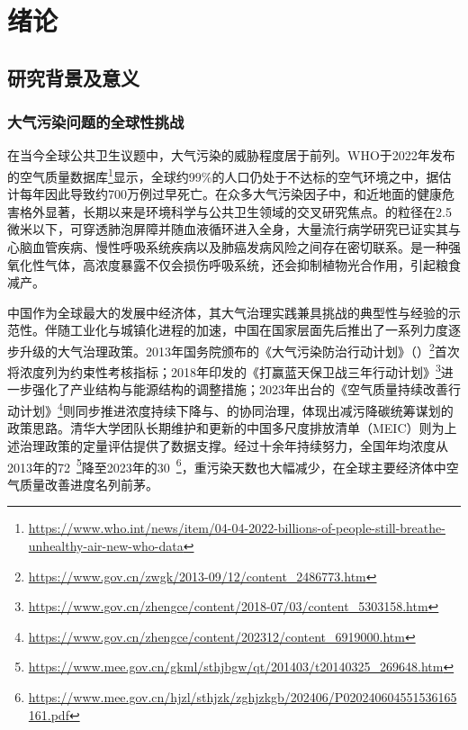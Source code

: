 

\chapter{绪论}
\label{chap:introduction}

\section{研究背景及意义}
\label{sec:background}

\subsection{大气污染问题的全球性挑战}
\label{subsec:global_challenge}

在当今全球公共卫生议题中，大气污染的威胁程度居于前列。WHO于2022年发布的空气质量数据库\footnote{\url{https://www.who.int/news/item/04-04-2022-billions-of-people-still-breathe-unhealthy-air-new-who-data}}显示，全球约99\%的人口仍处于不达标的空气环境之中，据估计每年因此导致约700万例过早死亡\citep{world2021global,murray2020global}。在众多大气污染因子中，\PM 和近地面\ozone 的健康危害格外显著，长期以来是环境科学与公共卫生领域的交叉研究焦点。\PM 的粒径在2.5微米以下，可穿透肺泡屏障并随血液循环进入全身，大量流行病学研究已证实其与心脑血管疾病、慢性呼吸系统疾病以及肺癌发病风险之间存在密切联系\citep{burnett2018global}。\ozone 是一种强氧化性气体，高浓度暴露不仅会损伤呼吸系统，还会抑制植物光合作用，引起粮食减产\citep{nuvolone2018effects,mills2018ozone}。

中国作为全球最大的发展中经济体，其大气治理实践兼具挑战的典型性与经验的示范性。伴随工业化与城镇化进程的加速，中国在国家层面先后推出了一系列力度逐步升级的大气治理政策。2013年国务院颁布的《大气污染防治行动计划》（）\footnote{\url{https://www.gov.cn/zwgk/2013-09/12/content_2486773.htm}}首次将\PM 浓度列为约束性考核指标\citep{china2013action}；2018年印发的《打赢蓝天保卫战三年行动计划》\footnote{\url{https://www.gov.cn/zhengce/content/2018-07/03/content_5303158.htm}}进一步强化了产业结构与能源结构的调整措施；2023年出台的《空气质量持续改善行动计划》\footnote{\url{https://www.gov.cn/zhengce/content/202312/content_6919000.htm}}则同步推进\PM 浓度持续下降与\NOx、\VOCs 的协同治理，体现出减污降碳统筹谋划的政策思路\citep{jiang2021government}。清华大学团队长期维护和更新的中国多尺度排放清单（MEIC）则为上述治理政策的定量评估提供了数据支撑\citep{zheng2018trends,geng2024efficacy}。经过十余年持续努力，全国\PM 年均浓度从2013年的72~\ug{}\footnote{\url{https://www.mee.gov.cn/gkml/sthjbgw/qt/201403/t20140325_269648.htm}}降至2023年的30~\ug{}\footnote{\url{https://www.mee.gov.cn/hjzl/sthjzk/zghjzkgb/202406/P020240604551536165161.pdf}}，重污染天数也大幅减少，在全球主要经济体中空气质量改善进度名列前茅\citep{zhang2019drivers,geng2024efficacy,zhao2024challenges,cn_lishaolin2023daqishitiao}。

